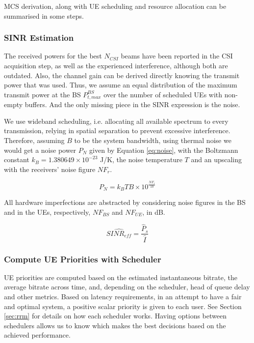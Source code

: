 MCS derivation, along with UE scheduling and resource allocation can be summarised in some steps.

\subsubsection*{SINR Estimation}

The received powers for the best $N_{CSI}$ beams have been reported in the CSI acquisition step, as well as the experienced interference, although both are outdated. Also, the channel gain can be derived directly knowing the transmit power that was used. Thus, we assume an equal distribution of the maximum transmit power at the BS $P_{t, max} ^ {BS}$ over the number of scheduled UEs with non-empty buffers. And the only missing piece in the SINR expression is the noise. 

We use wideband scheduling, i.e. allocating all available spectrum to every transmission, relying in spatial separation to prevent excessive interference. Therefore, assuming $B$ to be the system bandwidth, using thermal noise we would get a noise power $P_N$ given by Equation \eqref{eq:noise}, with the Boltzmann constant $k_B = 1.380649 \times 10^{-23}$ J/K, the noise temperature $T$ and an upscaling with the receivers' noise figure $NF_r$.


\begin{equation} \label{eq:noise}
    P_N = k_B T B \times 10^{\frac{NF_r}{10}}
\end{equation}

All hardware imperfections are abstracted by considering noise figures in the \acs{BS} and in the \acsp{UE}, respectively, $NF_{BS}$ and $NF_{UE}$, in dB.


\begin{equation} \label{eq:sinr_estimation}
    \hat{SINR_{eff}} = \frac{\hat{P}_s}{\hat{I}} 
\end{equation}






\subsubsection*{Compute UE Priorities with Scheduler}
UE priorities are computed based on the estimated instantaneous bitrate, the average bitrate across time, and, depending on the scheduler, head of queue delay and other metrics. Based on latency requirements, in an attempt to have a fair and optimal system, a positive scalar priority is given to each user. See Section \ref{sec:rrm} for details on how each scheduler works. Having options between schedulers allows us to know which makes the best decisions based on the achieved performance.


